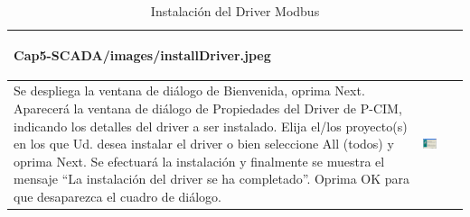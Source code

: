 \begin{table}[H]
\begin{tabular}{*{2}{m{}}}
\begin{center}
    {Cap5-SCADA/images/installDriver.jpeg}
  \end{center}\\
\hline
 Se despliega la ventana de diálogo de Bienvenida, oprima Next. 
 Aparecerá la ventana de diálogo de Propiedades del Driver de 
 P-CIM, indicando los detalles del driver a ser instalado.
 Elija el/los proyecto(s) en los que Ud. desea instalar el driver o bien 
 seleccione All (todos) y oprima Next.
 Se efectuará la instalación y finalmente se muestra el mensaje “La instalación 
 del driver se ha completado”. Oprima OK para que desaparezca el cuadro de 
 diálogo.
  &\begin{center}
    \includegraphics[width=0.4\textwidth]
    {Cap5-SCADA/images/installDriver2.jpeg}
  \end{center}\\
\hline
\end{tabular}
\caption{Instalación del Driver Modbus}
\label{tab:installModbus}
\end{table}

